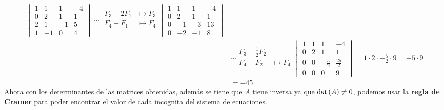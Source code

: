 \begin{enumerate}[label=\listAlph]
\[\begin{aligned}
\begin{vmatrix}
                        1 & 1 & 1 & -4 \\
                        0 & 2 & 1 & 1 \\
                        2 & 1 & -1 & 5 \\
                        1 & -1 & 0 & 4
                    \end{vmatrix}
                    \sim
                    \begin{aligned}
                        F_3 - 2F_1 &\mapsto F_3 \\
                        F_4 - F_1 &\mapsto F_4 \\
                    \end{aligned}
                    \begin{vmatrix}
                        1 & 1 & 1 & -4 \\
                        0 & 2 & 1 & 1 \\
                        0 & -1 & -3 & 13 \\
                        0 & -2 & -1 & 8
                    \end{vmatrix}
                    \\
                    &\sim
                    \begin{aligned}
                        F_3 + \frac{1}{2}F_2 \\
                        F_4 + F_2 &\mapsto F_4 \\
                    \end{aligned}
                    \begin{vmatrix}
                        1 & 1 & 1 & -4 \\
                        0 & 2 & 1 & 1 \\
                        0 & 0 & -\frac{5}{2} & \frac{25}{2} \\
                        0 & 0 & 0 & 9
                    \end{vmatrix}
                    = 1 \cdot 2 \cdot -\frac{5}{2} \cdot 9 = -5 \cdot 9
                    \\
                    &= -45
                \end{aligned}
            \]
            Ahora con los determinantes de las matrices obtenidas, además se tiene que \(A\) tiene inversa ya que \(\text{det} \left( A \right) \neq 0\), podemos usar la 
            \textbf{regla de Cramer} para poder encontrar el valor de cada incognita del sistema de ecuaciones.
            \[
                \begin{aligned}

\end{aligned}\]
\end{enumerate}
